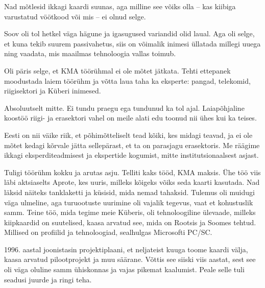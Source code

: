
Nad mõtlesid ikkagi kaardi suunas, aga milline see võiks olla – 
kas kiibiga varustatud vöötkood või mis – ei olnud selge. 


Soov oli tol hetkel väga hägune ja igasugused 
variandid olid laual. Aga oli selge, et kuna tekib suurem 
passivahetus, siis on võimalik inimesi üllatada millegi uuega ning vaadata, mis 
maailmas tehnoloogia vallas toimub. 

Oli päris selge, et KMA 
töörühmal ei ole mõtet jätkata. Tehti ettepanek moodustada 
laiem töörühm ja võtta laua taha ka eksperte: pangad, 
telekomid, riigisektori ja Küberi inimesed.


Absoluutselt mitte. Ei tundu praegu ega tundunud ka tol ajal. 
Laiapõhjaline koostöö riigi- ja erasektori vahel on meile alati edu 
toonud nii ühes kui ka teises. 


Eesti on nii väike riik, et põhimõtteliselt tead kõiki, kes midagi teavad, ja 
ei ole mõtet kedagi kõrvale jätta sellepärast, et ta on parasjagu erasektoris. Me räägime ikkagi eksperditeadmisest ja 
ekspertide kogumist, mitte institutsionaalsest asjast. 

Tuligi töörühm kokku ja arutas asju. Telliti kaks tööd, 
KMA maksis. Ühe töö viis läbi 
aktsiaselts Aprote, kes uuris, milleks kõigeks 
võiks seda kaarti kasutada. Nad läksid näiteks tanklaketti ja küsisid, 
mida nemad tahaksid. Tulemus oli muidugi väga ulmeline, aga turuootuste uurimine oli 
vajalik tegevus, vaat et kohustuslik samm. 
Teine töö, mida tegime meie Küberis, oli 
tehnoloogiline ülevaade, milleks kiipkaardid on suutelised, kaasa
arvatud see, mida on Rootsis ja Soomes tehtud. 
Millised on profiilid ja tehnoloogiad, sealhulgas Microsofti 
PC/SC. 

1996. aastal joonistasin projektiplaani, et neljateist kuuga 
toome kaardi välja, kaasa arvatud pilootprojekt ja muu säärane. Võttis see siiski viis 
aastat, sest see oli väga oluline samm ühiskonnas 
ja vajas pikemat kaalumist. Peale selle tuli seadusi juurde ja ringi teha. 

